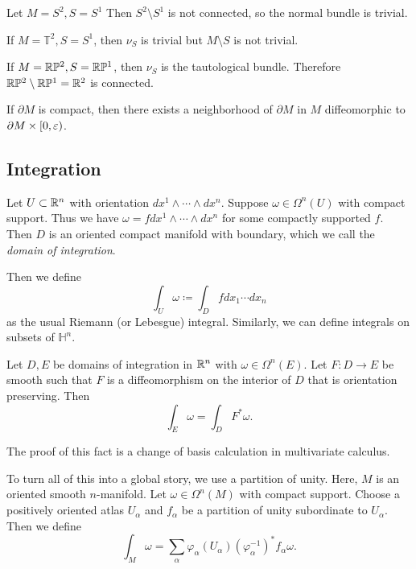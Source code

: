 \documentclass[twoside, 10pt]{article}
\renewcommand{\H}{\mathbb{H}}
\begin{document}
    \begin{exm} Let $M = S^2, S = S^1$ Then $S^2 \setminus S^1$ is not
    connected, so the normal bundle is trivial.  \end{exm}

    \begin{exm} If $M = \mathbb{T}^2, S = S^1$, then $\nu_S$ is trivial but $M
    \setminus S$ is not trivial.  \end{exm}

    \begin{exm} If $M = \mathbb{R}\mathbb{P}^2, S = \mathbb{R}\mathbb{P}^1$, then $\nu_S$ is the tautological
    bundle. Therefore $\mathbb{R}\mathbb{P}^2 \setminus \mathbb{R}\mathbb{P}^1 = \mathbb{R}^2$ is connected.  \end{exm}

    \begin{thm} If $\partial M$ is compact, then
    there exists a neighborhood of $\partial M$ in $M$ diffeomorphic to
$\partial M \times [0,\varepsilon)$.  \end{thm}

    \subsection{Integration}%
    
    Let $U \subset \mathbb{R}^n$ with orientation $dx^1 \wedge \cdots \wedge dx^n$.
    Suppose $\omega \in \Omega^n(U)$ with compact support. Thus we have $\omega
    = f dx^1 \wedge \cdots \wedge dx^n$ for some compactly supported $f$. Then
    $D$ is an oriented compact manifold with boundary, which we call the
    \textit{domain of integration}.

    Then we define \[ \int_U \omega \coloneqq \int_D f dx_1 \cdots dx_n\] as
    the usual Riemann (or Lebesgue) integral. Similarly, we can define
    integrals on subsets of $\H^n$.

    \begin{prop} Let $D,E$ be domains of integration in $\mathbb{R}^n$ with $\omega \in
        \Omega^n(E)$. Let $F:D \to E$ be smooth such that $F$ is a
        diffeomorphism on the interior of $D$ that is orientation preserving.
        Then \[ \int_E \omega = \int_D F^*\omega.\] \end{prop}

    The proof of this fact is a change of basis calculation in multivariate
    calculus.

    To turn all of this into a global story, we use a partition of unity. Here,
    $M$ is an oriented smooth $n$-manifold. Let $\omega \in \Omega^n(M)$ with
    compact support. Choose a positively oriented atlas $U_{\alpha}$ and
    $f_{\alpha}$ be a partition of unity subordinate to $U_{\alpha}$. Then we
    define \[ \int_M \omega = \sum_{\alpha} \varphi_{\alpha}(U_{\alpha})
    (\varphi_{\alpha}^{-1})^* f_{\alpha} \omega.\]
\end{document}
